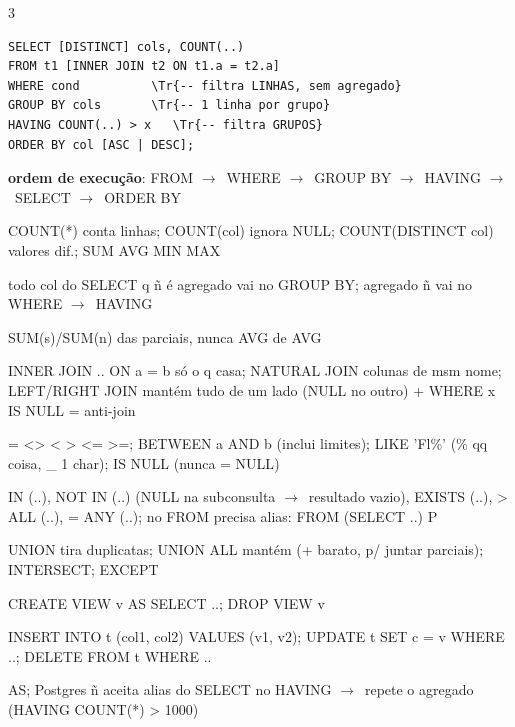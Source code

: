 \documentclass[a4paper]{article}
\newenvironment{dl}{\begin{description}[leftmargin=3.2mm,labelindent=0pt,itemsep=0.7pt,topsep=0.6pt,font=\color{tm}\bfseries,style=standard]}{\end{description}}
\newcommand{\h}[1]{\par\vspace{2.2pt}{\setlength{\fboxsep}{0.9pt}\colorbox{hd}{\parbox{\dimexpr\linewidth-1.8pt}{\color{white}\bfseries\ #1}}}\par\vspace{0.8pt}}
\newcommand{\go}{$\rightarrow$}
\newcommand{\q}[1]{{\ttfamily #1}}
\newcommand{\Tr}[1]{\textcolor{tr}{#1}}
\begin{document}
\begin{multicols*}{3}
\h{SQL RÁPIDO}
\begin{sql}
\begin{Verbatim}
SELECT [DISTINCT] cols, COUNT(..)
FROM t1 [INNER JOIN t2 ON t1.a = t2.a]
WHERE cond          \Tr{-- filtra LINHAS, sem agregado}
GROUP BY cols       \Tr{-- 1 linha por grupo}
HAVING COUNT(..) > x   \Tr{-- filtra GRUPOS}
ORDER BY col [ASC | DESC];
\end{Verbatim}
\end{sql}
\textbf{ordem de execução}: FROM \go\ WHERE \go\ GROUP BY \go\ HAVING \go\ SELECT \go\ ORDER BY
\begin{dl}
\item[agregados:] \q{COUNT(*)} conta linhas; \q{COUNT(col)} ignora NULL; \q{COUNT(DISTINCT col)} valores dif.; \q{SUM AVG MIN MAX}
\item[regra:] todo col do SELECT q ñ é agregado vai no GROUP BY; agregado ñ vai no WHERE \go\ HAVING
\item[AVG distrib.:] \q{SUM(s)/SUM(n)} das parciais, nunca AVG de AVG
\item[joins:] \q{INNER JOIN .. ON a = b} só o q casa; \q{NATURAL JOIN} colunas de msm nome; \q{LEFT/RIGHT JOIN} mantém tudo de um lado (NULL no outro) + \q{WHERE x IS NULL} = anti-join
\item[comparação:] \q{= <> < > <= >=}; \q{BETWEEN a AND b} (inclui limites); \q{LIKE 'Fl\%'} (\% qq coisa, \_ 1 char); \q{IS NULL} (nunca \q{= NULL})
\item[subconsulta:] \q{IN (..)}, \q{NOT IN (..)} (NULL na subconsulta \go\ resultado vazio), \q{EXISTS (..)}, \q{> ALL (..)}, \q{= ANY (..)}; no FROM precisa alias: \q{FROM (SELECT ..) P}
\item[conjuntos:] \q{UNION} tira duplicatas; \q{UNION ALL} mantém (+ barato, p/ juntar parciais); \q{INTERSECT}; \q{EXCEPT}
\item[view:] \q{CREATE VIEW v AS SELECT ..}; \q{DROP VIEW v}
\item[DML:] \q{INSERT INTO t (col1, col2) VALUES (v1, v2)}; \q{UPDATE t SET c = v WHERE ..}; \q{DELETE FROM t WHERE ..}
\item[alias:] \q{AS}; Postgres ñ aceita alias do SELECT no HAVING \go\ repete o agregado (\q{HAVING COUNT(*) > 1000})
\end{dl}


\end{multicols*}
\end{document}

